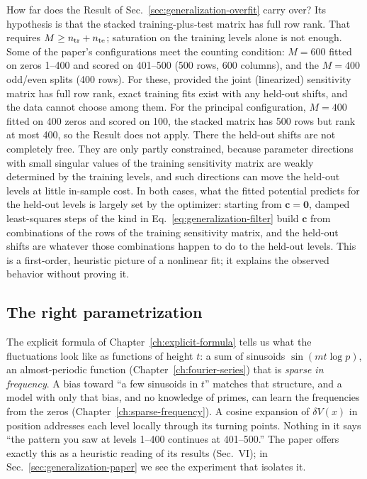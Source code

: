How far does the Result of Sec.~\ref{sec:generalization-overfit} carry over? Its hypothesis is that the stacked training-plus-test matrix has full row rank. That requires $M\ge n_{\rm tr}+n_{\rm te}$; saturation on the training levels alone is not enough. Some of the paper's configurations meet the counting condition: $M=600$ fitted on zeros 1--400 and scored on 401--500 (500 rows, 600 columns), and the $M=400$ odd/even splits (400 rows). For these, provided the joint (linearized) sensitivity matrix has full row rank, exact training fits exist with any held-out shifts, and the data cannot choose among them. For the principal configuration, $M=400$ fitted on 400 zeros and scored on 100, the stacked matrix has 500 rows but rank at most 400, so the Result does not apply. There the held-out shifts are not completely free. They are only partly constrained, because parameter directions with small singular values of the training sensitivity matrix are weakly determined by the training levels, and such directions can move the held-out levels at little in-sample cost. In both cases, what the fitted potential predicts for the held-out levels is largely set by the optimizer: starting from $\bm c=\bm 0$, damped least-squares steps of the kind in Eq.~\eqref{eq:generalization-filter} build $\bm c$ from combinations of the rows of the training sensitivity matrix, and the held-out shifts are whatever those combinations happen to do to the held-out levels. This is a first-order, heuristic picture of a nonlinear fit; it explains the observed behavior without proving it.

\subsection{The right parametrization}

The explicit formula of Chapter~\ref{ch:explicit-formula} tells us what the fluctuations look like as functions of height $t$: a sum of sinusoids $\sin(mt\log p)$, an almost-periodic function (Chapter~\ref{ch:fourier-series}) that is \emph{sparse in frequency}. A bias toward ``a few sinusoids in $t$'' matches that structure, and a model with only that bias, and no knowledge of primes, can learn the frequencies from the zeros (Chapter~\ref{ch:sparse-frequency}). A cosine expansion of $\delta V(x)$ in position addresses each level locally through its turning points. Nothing in it says ``the pattern you saw at levels 1--400 continues at 401--500.'' The paper offers exactly this as a heuristic reading of its results (Sec.~VI); in Sec.~\ref{sec:generalization-paper} we see the experiment that isolates it.

